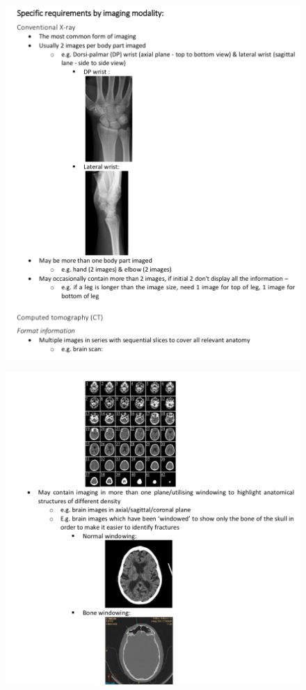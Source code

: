\begin{figure}[ht]
\centering
\includegraphics[width = 0.95\hsize]{./figures/ImagingSpec1}
\end{figure}
\clearpage

\begin{figure}[ht]
\centering
\includegraphics[width = 0.95\hsize]{./figures/ImagingSpec2}
\end{figure}
\clearpage

